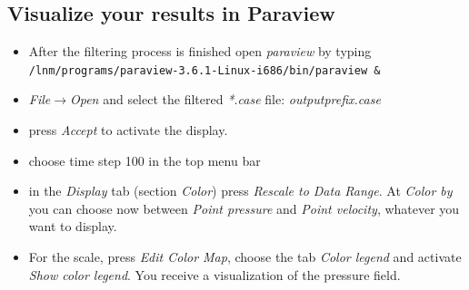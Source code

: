 \subsection{Visualize your results in Paraview}
\begin{itemize}
\item After the filtering process is finished open \emph{paraview} by typing \newline
\texttt{/lnm/programs/paraview-3.6.1-Linux-i686/bin/paraview \&}
\item \emph{File$\to$Open} and select the filtered \emph{*.case}
file: \emph{outputprefix.case}
\item press \emph{Accept} to activate the display.
\item choose time step 100 in the top menu bar 
\item in the \emph{Display} tab (section \emph{Color}) press \emph{Rescale to Data Range}. At \emph{Color by} you can choose now
between \emph{Point pressure} and \emph{Point velocity}, whatever
you want to display.
\item For the scale, press \emph{Edit Color Map}, choose the tab \emph{Color legend} and activate \emph{Show color legend}.
You receive a visualization of the pressure field.
\end{itemize}

